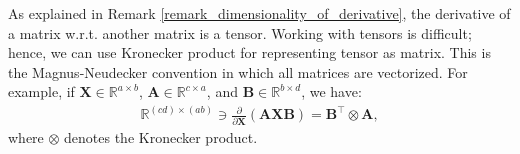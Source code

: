 \documentclass[lang=cn,10pt]{gorgeousnbook}
\numberwithin{equation}{section}%
\numberwithin{figure}{section}%
\begin{document}
\begin{lemma}\label{lemma_deriavtive_matrix_wrt_matrix}
As explained in Remark \ref{remark_dimensionality_of_derivative}, the derivative of a matrix w.r.t. another matrix is a tensor. 
Working with tensors is difficult; hence, we can use Kronecker product for representing tensor as matrix.
This is the Magnus-Neudecker convention \cite{magnus1985matrix} in which all matrices are vectorized.
For example, if $\boldsymbol{X} \in \mathbb{R}^{a \times b}$, $\boldsymbol{A} \in \mathbb{R}^{c \times a}$, and $\boldsymbol{B} \in \mathbb{R}^{b \times d}$, we have:
\begin{align}\label{equation_derivative_matrix_wrt_matrix}
\mathbb{R}^{(cd) \times (ab)} \ni \frac{\partial}{\partial \boldsymbol{X}} (\boldsymbol{A} \boldsymbol{X} \boldsymbol{B}) = \boldsymbol{B}^\top \otimes \boldsymbol{A},
\end{align}
where $\otimes$ denotes the Kronecker product. 
\end{lemma}
\end{document}
